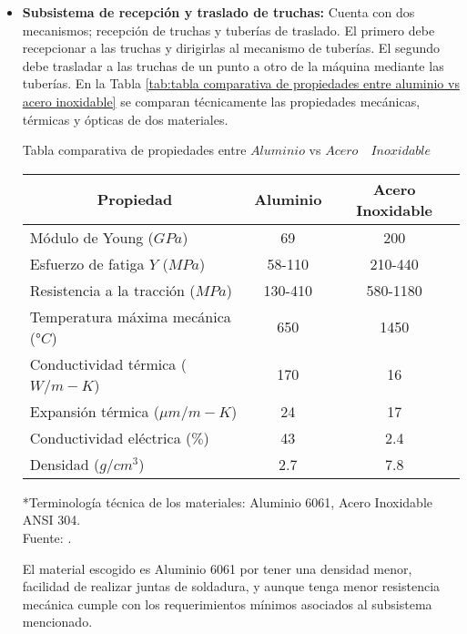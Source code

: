\begin{itemize}
	\item \textbf{Subsistema de recepción y traslado de truchas:} Cuenta con dos mecanismos; recepción de truchas y tuberías de traslado. El primero debe recepcionar a las truchas y dirigirlas al mecanismo de tuberías. El segundo debe trasladar a las truchas de un punto a otro de la máquina mediante las tuberías. En la Tabla \ref{tab:tabla comparativa de propiedades entre aluminio vs acero inoxidable} se comparan técnicamente las propiedades mecánicas, térmicas y ópticas de dos materiales.
	
	\begin{mytable}[H]
		\footnotesize\centering
		\caption{Tabla comparativa de propiedades entre $Aluminio$ vs $Acero \quad Inoxidable$}
		\label{tab:tabla comparativa de propiedades entre aluminio vs acero inoxidable}
		\begin{tabular}{|l|c|c|}
			\hline
			\multicolumn{1}{|c|}{\textbf{Propiedad}} & \textbf{Aluminio} & \textbf{Acero Inoxidable} \\ \hline
			Módulo de Young ($GPa$) & 69 & 200 \\ \hline
			Esfuerzo de fatiga $Y$ ($MPa$) & 58-110 & 210-440 \\ \hline
			Resistencia a la tracción ($MPa$) & 130-410 & 580-1180 \\ \hline
			Temperatura máxima mecánica (°$C$) & 650 & 1450 \\ \hline
			Conductividad térmica ($W/m-K$) & 170 & 16 \\ \hline
			Expansión térmica (${\mu}m/m-K$) & 24 & 17 \\ \hline
			Conductividad eléctrica ($\%$) & 43 & 2.4 \\ \hline
			Densidad ($g/cm^3$) & 2.7 & 7.8 \\ \hline
		\end{tabular}
		\begin{myflushcenteraftertable}
			*Terminología técnica de los materiales: Aluminio 6061, Acero Inoxidable ANSI 304.\\		
			Fuente: \cite{MakeItFrom2020}.
		\end{myflushcenteraftertable}
	\end{mytable}

	El material escogido es Aluminio 6061 por tener una densidad menor, facilidad de realizar juntas de soldadura, y aunque tenga menor resistencia mecánica cumple con los requerimientos mínimos asociados al subsistema mencionado.
	

\end{itemize}
